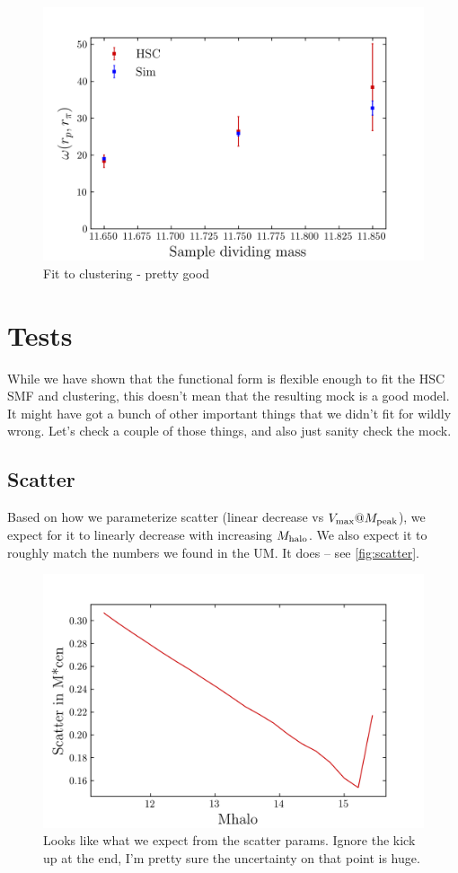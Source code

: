 \documentclass{article}
\makeatletter
\newcommand{\Mhalo}{\ensuremath{M_{\rm halo}}}
\newcommand{\vmp}{\ensuremath{V_{\rm max}@M_{\rm peak}}}
\makeatother
\begin{document}
\begin{figure}[h]
    \includegraphics[width=\textwidth]{images/fit_clust.png}
    \caption{Fit to clustering - pretty good
    \label{fig:fit_clust}
    }
\end{figure}

\section{Tests}

While we have shown that the functional form is flexible enough to fit the HSC SMF and clustering, this doesn't mean that the resulting mock is a good model. It might have got a bunch of other important things that we didn't fit for wildly wrong. Let's check a couple of those things, and also just sanity check the mock.


\subsection{Scatter}
Based on how we parameterize scatter (linear decrease vs \vmp{}), we expect for it to linearly decrease with increasing \Mhalo{}. We also expect it to roughly match the numbers we found in the UM. It does -- see \autoref{fig:scatter}.

\begin{figure}[h]
    \includegraphics[width=\textwidth]{images/scatter_mcen_mhalo.png}
    \caption{Looks like what we expect from the scatter params. Ignore the kick up at the end, I'm pretty sure the uncertainty on that point is huge.
    \label{fig:scatter}
}
\end{figure}
\end{document}
